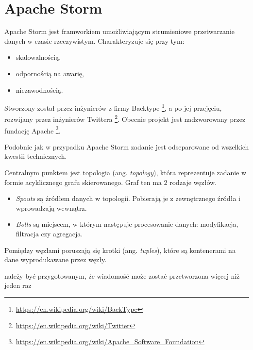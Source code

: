 \section{Apache Storm}
Apache Storm jest framworkiem umożliwiającym strumieniowe przetwarzanie danych w czasie rzeczywistym.
Charakteryzuje się przy tym:
\begin{itemize}
  \item skalowalnością,
  \item odpornością na awarię,
  \item niezawodnością.
\end{itemize}
Stworzony został przez inżynierów z firmy
Backtype \footnote{\url{https://en.wikipedia.org/wiki/BackType}},
a po jej przejęciu, rozwijany przez inżynierów Twittera \footnote{\url{https://en.wikipedia.org/wiki/Twitter}}.
Obecnie projekt jest nadzworowany przez fundację Apache \footnote{\url{https://en.wikipedia.org/wiki/Apache_Software_Foundation}}.

Podobnie jak w przypadku Apache Storm zadanie jest odseparowane od wszelkich kwestii technicznych.

Centralnym punktem jest topologia (ang. \textit{topology}),
która reprezentuje zadanie w formie acyklicznego grafu skierowanego.
Graf ten ma 2 rodzaje węzłów.
\begin{itemize}
  \item \textit{Spouts} są źródłem danych w topologii.
  Pobierają je z zewnętrznego źródła i wprowadzają wewnątrz.
  \item \textit{Bolts} są miejscem,
  w którym następuje procesowanie danych: modyfikacja, filtracja czy agregacja.
\end{itemize}
Pomiędzy węzłami poruszają się krotki (ang. \textit{tuples}),
które są kontenerami na dane wyprodukawane przez węzły.

należy być przygotowanym,
że wiadomość może zostać przetworzona więcej niż jeden raz
